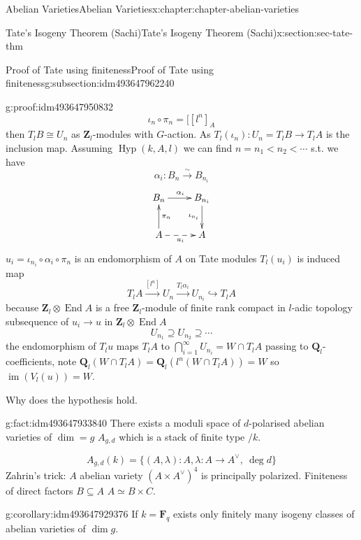 \documentclass[oneside,10pt,]{book}
\numberwithin{equation}{section}
\newcommand{\lb}{[}
\newcommand{\ZZ}{\mathbf{Z}}
\newcommand{\QQ}{\mathbf{Q}}
\newcommand{\FF}{\mathbf{F}}
\DeclareMathOperator{\End}{End}
\DeclareMathOperator{\im}{im}
\newcommand{\lt}{<}
\begin{document}
\begin{chapterptx}{Abelian Varieties}{}{Abelian Varieties}{}{}{x:chapter:chapter-abelian-varieties}
\begin{sectionptx}{Tate's Isogeny Theorem (Sachi)}{}{Tate's Isogeny Theorem (Sachi)}{}{}{x:section:sec-tate-thm}
\begin{subsectionptx}{Proof of Tate using finiteness}{}{Proof of Tate using finiteness}{}{}{g:subsection:idm493647962240}
\begin{proofptx}{}{g:proof:idm493647950832}
\begin{equation*}
\iota_n \circ \pi_n  =  \lb [l^n]_A
\end{equation*}
then \(T_lB \cong U_n\) as \(\ZZ_l\)-modules with \(G\)-action. As \(T_l(\iota_n) \colon U_n =T_l B  \to T_l A\) is the inclusion map. Assuming \(\operatorname{Hyp}(k,A,l)\) we can find \(n = n_1 \lt n_2 \lt \cdots\) s.t. we have%
\begin{equation*}
\alpha_i \colon B_n \xrightarrow{\sim} B_{n_i}
\end{equation*}
%
\begin{equation*}
\xymatrix{
B_n \ar[r]^{\alpha_i} & B_{n_i} \ar[d]_{\iota_{n_i}}\\
A\ar[u]_{\pi_n} \ar@{-->}_{u_i}[r] & A
}
\end{equation*}
\(u_i = \iota_{n_i} \circ \alpha_i \circ \pi_n\) is an endomorphism of \(A\) on Tate modules \(T_l(u_i)\) is induced map%
\begin{equation*}
T_l A \xrightarrow{[l^n]} U_n \xrightarrow{T_l\alpha_i} U_{n_i} \hookrightarrow T_l A
\end{equation*}
because \(\ZZ_l \otimes \End A\) is a free \(\ZZ_l\)-module of finite rank compact in \(l\)-adic topology subsequence of \(u_i \to u\) in \(\ZZ_l \otimes \End A\)%
\begin{equation*}
U_{n_1} \supseteq U_{n_2} \supseteq \cdots
\end{equation*}
the endomorphism of \(T_l u\) maps \(T_l A\) to \(\bigcap_{i=1}^\infty U_{n_i} = W\cap T_l A\) passing to \(\QQ_l\)-coefficients, note \(\QQ_l(W\cap T_l A) = \QQ_l(l^n(W\cap T_l A)) = W\) so \(\im(V_l(u)) =W\).%
\end{proofptx}
Why does the hypothesis hold.%
\begin{fact}{}{}{g:fact:idm493647933840}%
There exists a moduli space of \(d\)-polarised abelian varieties of \(\dim = g\) \(A_{g,d}\) which is a stack of finite type \(/k\).%
\end{fact}
%
\begin{equation*}
A_{g,d}( k) = \{(A,\lambda) : A , \lambda \colon A \to A^\vee,\ \deg d \}
\end{equation*}
Zahrin's trick: \(A\) abelian variety \((A\times A^\vee)^4\) is principally polarized. Finiteness of direct factors \(B\subseteq A\) \(A\simeq B\times C\).%
\begin{corollary}{}{}{g:corollary:idm493647929376}%
If \(k = \FF_q\) exists only finitely many isogeny classes of abelian varieties of \(\dim g\).%
\end{corollary}

\end{subsectionptx}
\end{sectionptx}
\end{chapterptx}
\end{document}

